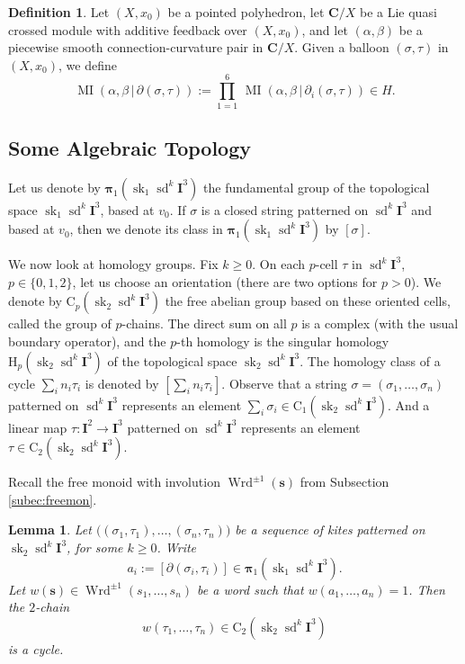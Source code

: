 \documentclass[10pt, a4paper]{amsart}
\newtheorem{lem}[equation]{Lemma}
\theoremstyle{definition}
\newtheorem{dfn}[equation]{Definition}
\numberwithin{equation}{section}
\newcommand{\opn}{\operatorname}
\newcommand{\mbf}[1]{\mathbf{#1}}
\newcommand{\mrm}[1]{\mathrm{#1}}
\newcommand{\bsym}[1]{\boldsymbol{#1}}
\renewcommand{\vert}{\, | \,}
\begin{document}
\begin{dfn} \label{dfn:35}
Let $(X, x_0)$ be a pointed polyhedron, let
$\mbf{C} / X$ be a Lie quasi crossed module with additive feedback
over $(X, x_0)$, and
let $(\alpha, \beta)$ be a piecewise smooth connection-curvature pair in 
$\mbf{C} / X$. Given a balloon $(\sigma, \tau)$ in $(X, x_0)$, we define
\[ \opn{MI}(\alpha, \beta \vert \partial(\sigma, \tau)) :=
\prod_{1 = 1}^6 \, \opn{MI}(\alpha, \beta \vert \partial_i(\sigma, \tau))
\in H . \]
\end{dfn}



\subsection{Some Algebraic Topology}
Let us denote by $\bsym{\pi}_1(\opn{sk}_1 \opn{sd}^k \mbf{I}^3)$
the fundamental group of the topological space 
$\opn{sk}_1 \opn{sd}^k \mbf{I}^3$, based at $v_0$. 
If $\sigma$ is a closed string patterned on $\opn{sd}^k \mbf{I}^3$ and based at
$v_0$, then we denote its class in 
$\bsym{\pi}_1(\opn{sk}_1 \opn{sd}^k \mbf{I}^3)$
by $[\sigma]$.

We now look at homology groups. Fix $k \geq 0$. On each $p$-cell $\tau$ in 
$\opn{sd}^k \mbf{I}^3$, $p \in \{0, 1, 2\}$, let us choose an orientation
(there are two options for $p > 0$).  
We denote by $\mrm{C}_p(\opn{sk}_2 \opn{sd}^k \mbf{I}^3)$
the free abelian group based on these oriented cells, called the group of
$p$-chains. 
The direct sum on all $p$ is a complex (with the usual boundary operator), and
the $p$-th homology is the singular homology
$\mrm{H}_p(\opn{sk}_2 \opn{sd}^k \mbf{I}^3)$ of the topological space
$\opn{sk}_2 \opn{sd}^k \mbf{I}^3$. 
The homology class of a cycle $\sum_i n_i \tau_i$ is denoted by
$[\sum_i n_i \tau_i]$.
Observe that a string $\sigma = (\sigma_1, \ldots, \sigma_n)$ patterned on
$\opn{sd}^k \mbf{I}^3$ represents an element
$\sum_i \sigma_i \in \mrm{C}_1(\opn{sk}_2 \opn{sd}^k \mbf{I}^3)$.
And a linear map $\tau : \mbf{I}^2 \to \mbf{I}^3$ patterned on
$\opn{sd}^k \mbf{I}^3$ represents an element
$\tau \in \mrm{C}_2(\opn{sk}_2 \opn{sd}^k \mbf{I}^3)$.

Recall the free monoid with involution $\opn{Wrd}^{\pm 1}(\bsym{s})$ from
Subsection
\ref{subec:freemon}.

\begin{lem} \label{lem:20}
Let 
$\bigl( (\sigma_1, \tau_1), \ldots, (\sigma_n, \tau_n) \bigr)$
be a sequence of kites patterned on $\opn{sk}_2 \opn{sd}^k \mbf{I}^3$, for some
$k \geq 0$. Write
\[ a_i := [\partial (\sigma_i, \tau_i)] \in 
\bsym{\pi}_1(\opn{sk}_1 \opn{sd}^k \mbf{I}^3) . \]
Let $w(\bsym{s}) \in \opn{Wrd}^{\pm 1}(s_1, \ldots, s_n)$ be a word such that
$w(a_1, \ldots, a_n) = 1$. 
Then the  $2$-chain 
\[ w(\tau_1, \ldots, \tau_n) \in \mrm{C}_2(\opn{sk}_2 \opn{sd}^k \mbf{I}^3) \]
is a cycle.
\end{lem}
\end{document}
